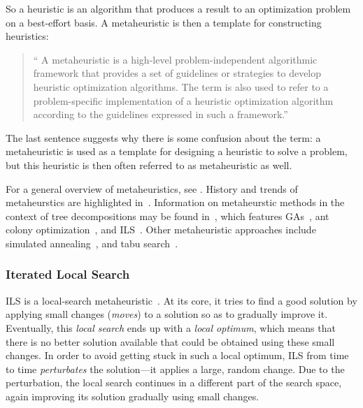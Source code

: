 \documentclass[thesis.tex]{subfiles}
\begin{document}
So a heuristic is an algorithm that produces a result to an optimization problem on a best-effort basis. A metaheuristic is then a template for constructing heuristics:
\begin{quotation}\enquote{%
   A metaheuristic is a high-level problem-independent algorithmic framework that provides a set of guidelines or strategies to develop heuristic optimization algorithms. The term is also used to refer to a problem-specific implementation of a heuristic optimization algorithm according to the guidelines expressed in such a framework.}
\end{quotation}

The last sentence suggests why there is some confusion about the term: a metaheuristic is used as a template for designing a heuristic to solve a problem, but this heuristic is then often referred to as metaheuristic as well.

For a general overview of metaheuristics, see \parencite{sorensen2013metaheuristics}. History and trends of metaheurstics are highlighted in~\parencite{metaheuristics-metapher-exposed}.
Information on metaheurstic methods in the context of tree decompositions may be found in~\parencite{hammerl-musliu-schafhauser-metaheuristicAlgorithms}, which features \glspl{GA}~\parencite{schafhauser-thesis,schafhauser-paper,larranaga-1997-GA}, ant colony optimization~\parencite{hammerl-thesis,hammerl-paper}, and \gls{ILS}~\parencite{musliu-2008-ILS}. Other metaheuristic approaches include simulated annealing~\parencite{kjarulff-1992-SA}, and tabu search~\parencite{clautiaux-2004-tabu}.

\subsubsection{Iterated Local Search}
   \label{ILS}
%
\gls{ILS} is a local-search metaheuristic~\parencite{stuetzle-ILS,sorensen2013metaheuristics}. At its core, it tries to find a good solution by applying small changes (\emph{moves}) to a solution so as to gradually improve it. Eventually, this \emph{local search} ends up with a \emph{local optimum}, which means that there is no better solution available that could be obtained using these small changes. In order to avoid getting stuck in such a local optimum, \gls{ILS} from time to time \emph{perturbates} the solution---it applies a large, random change. Due to the perturbation, the local search continues in a different part of the search space, again improving its solution gradually using small changes.
\end{document}
